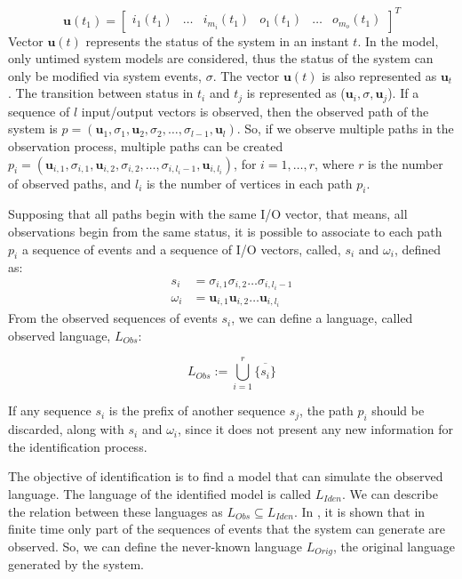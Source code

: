 \begin{equation*}
\mathbf{u}(t_1)=
\begin{bmatrix}
  i_1(t_1)&
  \dots&
  i_{m_i}(t_1)&
  o_1(t_1)&
  \dots&
  o_{m_o}(t_1)
\end{bmatrix}^T
\end{equation*}
\newcommand{\vu}{\mathbf{u}}
 Vector $\mathbf{u}(t)$ represents the status of the system in an instant
 $t$. In the \DAOCT{} model, only untimed system models are considered, thus
 the status of the system can only be modified via system events, $\sigma$.
The vector $\mathbf{u}(t)$ is also represented as $\vu_t$.
 The
 transition between status in $t_i$ and $t_j$ is represented as
 ($\vu_i,\sigma,\vu_j$).
 If a sequence of
 $l$ input\slash output vectors is observed, then the observed path of the
 system is
 $p=(\vu_1,\sigma_1,\vu_2,\sigma_2,\dots,\sigma_{l-1},\vu_l)$.
So, if we observe multiple paths in the observation process, 
multiple paths can be created
$p_i=(\vu_{i,1},\sigma_{i,1},\vu_{i,2},\sigma_{i,2},\dots,\sigma_{i,l_i-1},\vu_{i,l_i})$,
for $i=1,\dots,r$, where $r$ is the number of observed paths, and $l_i$ is the
number of vertices in each path $p_i$.

Supposing that all paths begin with the same I\slash O vector, that means, all
observations begin from the same status, it is possible to associate to each
path $p_i$ a sequence of events and a sequence of I\slash O vectors, called,
$s_i$ and $\omega_i$, defined as:
\begin{align*}
  s_i&= \sigma_{i,1}\sigma_{i,2}\dots\sigma_{i,l_i-1} \\
  \omega_i&= \vu_{i,1}\vu_{i,2}\dots\vu_{i,l_i}
\end{align*}
From the observed sequences of events $s_i$, we can define a language, called observed language, $L_{Obs}$:

\begin{equation}
  L_{Obs}:= \bigcup^r_{i=1}\overline{\{s_i\}}
\end{equation}
\begin{observation}
If any sequence $s_i$ is the prefix of another sequence $s_j$, the path $p_i$ should
be discarded, along with $s_i$ and $\omega_i$, since it does not present any new
information for the identification process.
\end{observation}
The objective of identification is to find a model that
can simulate the observed language. The language of the identified model is
called $L_{Iden}$.
We can describe the relation between these languages as $L_{Obs} \subseteq
L_{Iden}$.
In
\cite{moreira2018enhanced}, it is shown that in finite time only part of the
sequences of events that
the system can generate are observed. So, we can define the never-known language $L_{Orig}$,
the original language generated by the system.


